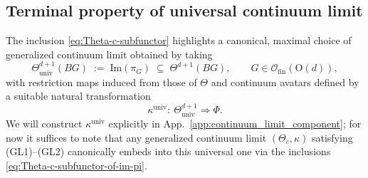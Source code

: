 \documentclass[aps,prx,reprint,superscriptaddress,twocolumn,amsmath,amssymb,amsfonts, nofootinbib]{revtex4-2}
\newcommand{\ofin}{\mathcal{O}_{\text{fin}}}
\theoremstyle{apsstyle}
\begin{document}
\subsection{Terminal property of universal continuum limit}
\label{app:maximal}

The inclusion \eqref{eq:Theta-c-subfunctor} highlights a canonical, maximal choice of generalized continuum limit obtained by taking
\begin{equation}
    \Theta^{d+1}_{\mathrm{univ}}(BG)
    \;:=\;
    \mathrm{Im}(\pi_{G})
    \;\subseteq\;
    \Theta^{d+1}(BG),
    \qquad G\in\ofin(\mathrm{O}(d)),
    \label{eq:universal-Theta-c2}
\end{equation}
with restriction maps induced from those of $\Theta$ and continuum avatars
defined by a suitable natural transformation
\begin{equation*}
    \kappa^{\mathrm{univ}}:\ \Theta^{d+1}_{\mathrm{univ}}\Rightarrow \Phi.
\end{equation*}
We will construct $\kappa^{\mathrm{univ}}$ explicitly in App.~\ref{app:continuum_limit_component};
for now it suffices to note that any generalized continuum limit
$(\Theta_{c},\kappa)$ satisfying (GL1)–(GL2) canonically embeds into this
universal one via the inclusions \eqref{eq:Theta-c-subfunctor-of-im-pi}. 

\bigskip
\end{document}
